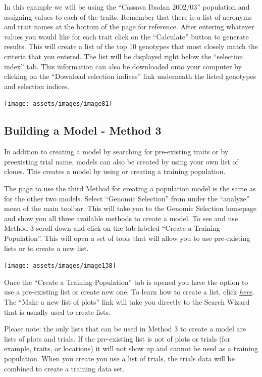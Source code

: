 \documentclass[
  12pt,
]{book}
\begin{document}
In this example we will be using the ``Cassava Ibadan 2002/03'' population and assigning values to each of the traits. Remember that there is a list of acronyms and trait names at the bottom of the page for reference. After entering whatever values you would like for each trait click on the ``Calculate'' button to generate results. This will create a list of the top 10 genotypes that most closely match the criteria that you entered. The list will be displayed right below the ``selection index'' tab. This information can also be downloaded onto your computer by clicking on the ``Download selection indices'' link underneath the listed genotypes and selection indices.

\begin{center}\texttt{[image: assets/images/image81]} \end{center}

\hypertarget{building-a-model---method-3}{%
\subsection{Building a Model - Method 3}\label{building-a-model---method-3}}

In addition to creating a model by searching for pre-existing traits or by preexisting trial name, models can also be created by using your own list of clones. This creates a model by using or creating a training population.

The page to use the third Method for creating a population model is the same as for the other two models. Select ``Genomic Selection'' from under the ``analyze'' menu of the main toolbar. This will take you to the Genomic Selection homepage and show you all three available methods to create a model. To see and use Method 3 scroll down and click on the tab labeled ``Create a Training Population''. This will open a set of tools that will allow you to use pre-existing lists or to create a new list.

\begin{center}\texttt{[image: assets/images/image138]} \end{center}

Once the ``Create a Training Population'' tab is opened you have the option to use a pre-existing list or create new one. To learn how to create a list, click \protect\hyperlink{working-with-lists}{\emph{here}}. The ``Make a new list of plots'' link will take you directly to the Search Wizard that is usually used to create lists.

Please note: the only lists that can be used in Method 3 to create a model are lists of plots and trials. If the pre-existing list is not of plots or trials (for example, traits, or locations) it will not show up and cannot be used as a training population. When you create you use a list of trials, the trials data will be combined to create a training data set.
\end{document}
